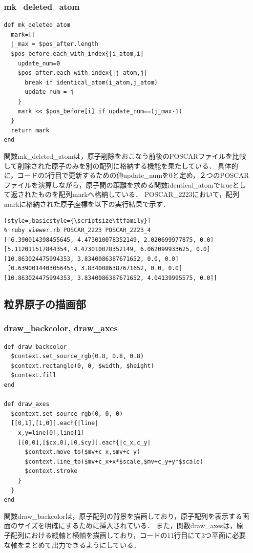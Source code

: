 \subsubsection{mk\_deleted\_atom}\begin{lstlisting}[style=customRuby,basicstyle={\scriptsize\ttfamily}]
def mk_deleted_atom
  mark=[]
  j_max = $pos_after.length
  $pos_before.each_with_index{|i_atom,i|
    update_num=0
    $pos_after.each_with_index{|j_atom,j|
      break if identical_atom(i_atom,j_atom)
      update_num = j
    }
    mark << $pos_before[i] if update_num==(j_max-1)
  }
  return mark
end
\end{lstlisting}
関数mk\_deleted\_atomは，原子削除をおこなう前後のPOSCARファイルを比較して削除された原子のみを別の配列に格納する機能を果たしている．
具体的に，コードの5行目で更新するための値update\_numを0と定め，２つのPOSCARファイルを演算しながら，原子間の距離を求める関数identical\_atomでtrueとして返されたものを配列markへ格納している．
POSCAR\_2223において，配列markに格納された原子座標を以下の実行結果で示す．
\begin{lstlisting}[style=,basicstyle={\scriptsize\ttfamily}]
% ruby viewer.rb POSCAR_2223 POSCAR_2223_4
[[6.390014398455645, 4.473010078352149, 2.020699977875, 0.0] 
[5.112011517844354, 4.473010078352149, 6.062099933625, 0.0] 
[10.863024475994353, 3.8340086387671652, 0.0, 0.0]
 [0.6390014403056455, 3.8340086387671652, 0.0, 0.0] 
[10.863024475994353, 3.8340086387671652, 4.04139995575, 0.0]]
\end{lstlisting}
\subsection{粒界原子の描画部}
\subsubsection{draw\_backcolor, draw\_axes}\begin{lstlisting}[style=customRuby,basicstyle={\scriptsize\ttfamily}]
def draw_backcolor
  $context.set_source_rgb(0.8, 0.8, 0.8)
  $context.rectangle(0, 0, $width, $height)
  $context.fill
end

def draw_axes
  $context.set_source_rgb(0, 0, 0)
  [[0,1],[1,0]].each{|line|
    x,y=line[0],line[1]
    [[0,0],[$cx,0],[0,$cy]].each{|c_x,c_y|
      $context.move_to($mv+c_x,$mv+c_y)
      $context.line_to($mv+c_x+x*$scale,$mv+c_y+y*$scale)
      $context.stroke
    }
  }
end
\end{lstlisting}
関数draw\_backcolorは，原子配列の背景を描画しており，原子配列を表示する画面のサイズを明確にするために挿入されている．
また，関数draw\_axesは，原子配列における縦軸と横軸を描画しており，コードの11行目にて3つ平面に必要な軸をまとめて出力できるようにしている．

